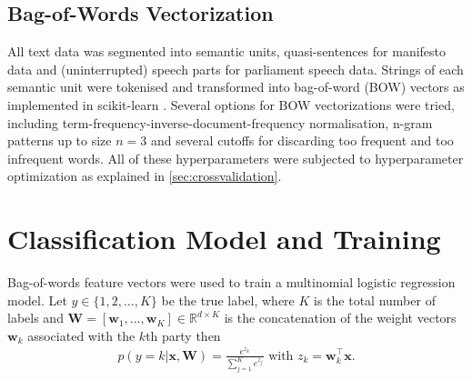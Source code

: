 \documentclass[11pt]{article}
\renewcommand{\vec}[1]{\mathbf{#1}}
\newcommand{\R}{\mathds{R}}
\begin{document}
\subsection{Bag-of-Words Vectorization}\label{sec:bow-vectorization}
All text data was segmented into semantic units, quasi-sentences for manifesto data and (uninterrupted) speech parts for parliament speech data. Strings of each semantic unit were tokenised and transformed into bag-of-word (BOW) vectors as implemented in scikit-learn \cite{scikit-learn}. Several options for BOW vectorizations were tried, including term-frequency-inverse-document-frequency normalisation, n-gram patterns up to size $n=3$ and several cutoffs for discarding too frequent and too infrequent words. All of these hyperparameters were subjected to hyperparameter optimization as explained in \autoref{sec:crossvalidation}.

\section{Classification Model and Training}\label{sec:model}
Bag-of-words feature vectors were used to train a multinomial logistic regression model. Let $y\in\{1,2,\dots,K\}$ be the true  label, where $K$ is the total number of labels and $\vec{W}=[\vec{w}_1,\dots,\vec{w}_K]\in\R^{d\times K}$ is the concatenation of the weight vectors $\vec{w}_k$ associated with the $k$th party then
\begin{eqnarray}\label{eq:logreg_multiclass}
p(y=k|\vec{x},\vec{W}) = \frac{e^{z_k}}{\sum_{j=1}^K e^{z_j}}  \textrm{ with }  z_k=\vec{w}_k^{\top}\vec{x}.
\end{eqnarray}
\end{document}
